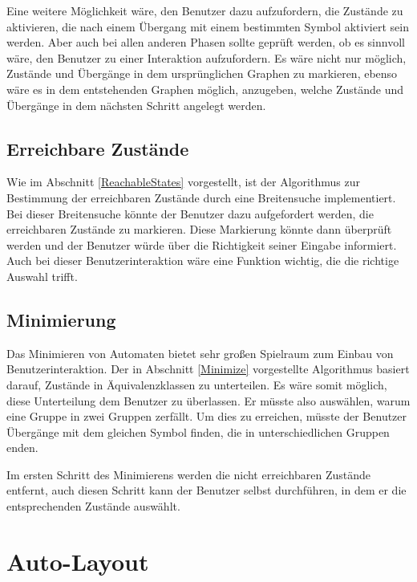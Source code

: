 Eine weitere Möglichkeit wäre, den Benutzer dazu aufzufordern, die Zustände zu
aktivieren, die nach einem Übergang mit einem bestimmten Symbol aktiviert sein
werden. Aber auch bei allen anderen Phasen sollte geprüft werden, ob es sinnvoll
wäre, den Benutzer zu einer Interaktion aufzufordern. Es wäre nicht nur möglich,
Zustände und Übergänge in dem ursprünglichen Graphen zu markieren, ebenso wäre es
in dem entstehenden Graphen möglich, anzugeben, welche Zustände und Übergänge in
dem nächsten Schritt angelegt werden.\vspace{10pt}


\subsection{Erreichbare Zustände}\label{PerspectiveReachableStates}
Wie im Abschnitt \ref{ReachableStates} vorgestellt, ist der Algorithmus zur
Bestimmung der erreichbaren Zustände durch eine Breitensuche implementiert. Bei
dieser Breitensuche könnte der Benutzer dazu aufgefordert werden, die
erreichbaren Zustände zu markieren. Diese Markierung könnte dann überprüft werden
und der Benutzer würde über die Richtigkeit seiner Eingabe informiert. Auch bei
dieser Benutzerinteraktion wäre eine Funktion wichtig, die die richtige Auswahl
trifft.\vspace{10pt}


\subsection{Minimierung}\label{PerspectiveMinimize}
Das Minimieren von Automaten bietet sehr großen Spielraum zum Einbau von
Benutzerinteraktion. Der in Abschnitt \ref{Minimize} vorgestellte Algorithmus
basiert darauf, Zustände in Äquivalenz\-klassen zu unterteilen. Es wäre somit
möglich, diese Unterteilung dem Benutzer zu überlassen. Er müsste also
auswählen, warum eine Gruppe in zwei Gruppen zerfällt. Um dies zu erreichen,
müsste der Benutzer Übergänge mit dem gleichen Symbol finden, die in
unterschiedlichen Gruppen enden.\vspace{10pt}

Im ersten Schritt des Minimierens werden die nicht erreichbaren Zustände
entfernt, auch diesen Schritt kann der Benutzer selbst durchführen, in dem er die
entsprechenden Zustände auswählt.\vspace{10pt}


\section{Auto-Layout}\label{PerspectiveAutoLayout}

